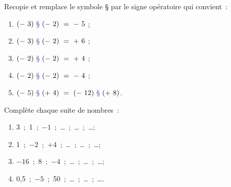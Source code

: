 \begin{exercice}
Recopie et remplace le symbole \textcolor{PartieGeometrie}{§} par le signe opératoire qui convient :
\begin{enumerate}
 \item $(- 3) \text{\textcolor{PartieGeometrie}{§}} (- 2) = - 5$ ;
 \item $(- 3) \text{\textcolor{PartieGeometrie}{§}} (- 2) = + 6$ ;
 \item $(- 2) \text{\textcolor{PartieGeometrie}{§}} (- 2) = + 4$ ;
 \item $(- 2) \text{\textcolor{PartieGeometrie}{§}} (- 2) = - 4$ ;
 \item $(- 5) \text{\textcolor{PartieGeometrie}{§}} (+ 4) = (- 12) \text{\textcolor{PartieGeometrie}{§}} (+ 8)$.
 \end{enumerate}
\end{exercice}


\begin{exercice}[Logique !]
Complète chaque suite de nombres :
\begin{enumerate}
 \item 3 ; 1 ; $- 1$ ; \ldots ; \ldots ; \ldots ;
 \item 1 ; $- 2$ ; $+ 4$ ; \ldots ; \ldots ; \ldots ;
 \item $- 16$ ; 8 ; $- 4$ ; \ldots ; \ldots ; \ldots ;
 \item 0,5 ; $- 5$ ; 50 ; \ldots ; \ldots ; \ldots .
 \end{enumerate}
\end{exercice}


